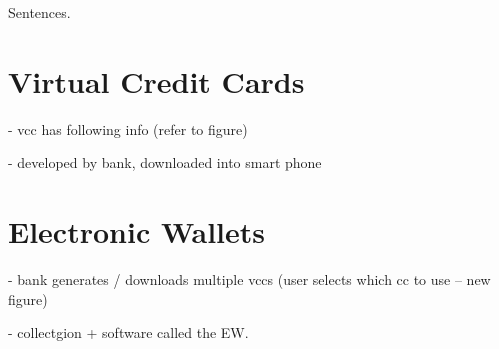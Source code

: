 Sentences.

\section{Virtual Credit Cards}

- vcc has following info (refer to figure)

- developed by bank, downloaded into smart phone

\section{Electronic Wallets}

- bank generates / downloads multiple vccs (user selects which cc to use -- new figure)

- collectgion  + software called the EW.
